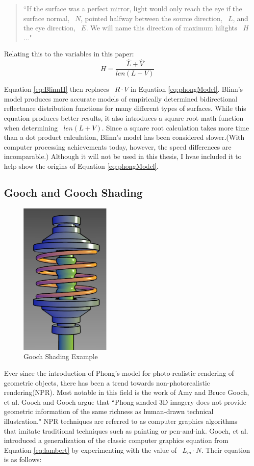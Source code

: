 \begin{quote}
``If the surface was a perfect mirror, light would only reach the eye if the surface normal, ~$N$, pointed halfway between the source direction, ~$L$, and the eye direction, ~$E$.  We will name this direction of maximum hilights ~$H$..."
\end{quote}
Relating this to the variables in this paper:
\begin{equation}
\label{eq:BlinnH}
H = \frac{\hat{L} + \hat{V}}{len(L+V)}
\end{equation}

Equation \ref{eq:BlinnH} then replaces ~$R \cdot V$ in Equation \ref{eq:phongModel}.  Blinn's model produces more accurate models of empirically determined  bidirectional reflectance distribution functions for many different types of surfaces\cite{ngan2004experimental}.  While this equation produces better results, it also introduces a square root math function when determining  ~$len(L+V)$.  Since a square root calculation takes more time than a dot product calculation, Blinn's model has been considered slower.(With computer processing achievements today, however, the speed differences are incomparable.)  Although it will not be used in this thesis, I hvae included it to help show the origins of Equation \ref{eq:phongModel}.

\subsection{Gooch and Gooch Shading}
\label{subsec:GoochShading}
\begin{figure}[h]
\centering
\includegraphics[height=3.0in]{figures/gooch.jpg}
\caption{Gooch Shading Example\cite{gooch1998non}}
\label{fig:gooch}
\end{figure}
Ever since the introduction of Phong's model for photo-realistic rendering of geometric objects, there has been a trend towards non-photorealistic rendering(NPR).  Most notable in this field is the work of Amy and Bruce Gooch, et al.  Gooch and Gooch argue that ``Phong shaded 3D imagery does not provide geometric information of the same richness as human-drawn technical illustration\cite{gooch1998non}."    NPR techniques are referred to as computer graphics algorithms that imitate traditional techniques such as painting or pen-and-ink\cite{gooch1998non}.  Gooch, et al. introduced a generalization of the classic computer graphics equation from Equation \ref{eq:lambert} by experimenting with the value of ~$L_{m} \cdot N$.  Their equation is as follows:


